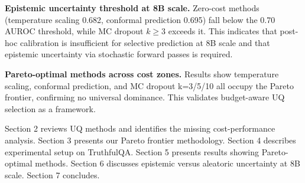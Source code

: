 \textbf{Epistemic uncertainty threshold at 8B scale.} Zero-cost methods (temperature scaling 0.682, conformal prediction 0.695) fall below the 0.70 AUROC threshold, while MC dropout $k\geq 3$ exceeds it. This indicates that post-hoc calibration is insufficient for selective prediction at 8B scale and that epistemic uncertainty via stochastic forward passes is required.

\textbf{Pareto-optimal methods across cost zones.} Results show temperature scaling, conformal prediction, and MC dropout k=3/5/10 all occupy the Pareto frontier, confirming no universal dominance. This validates budget-aware UQ selection as a framework.

Section 2 reviews UQ methods and identifies the missing cost-performance analysis. Section 3 presents our Pareto frontier methodology. Section 4 describes experimental setup on TruthfulQA. Section 5 presents results showing Pareto-optimal methods. Section 6 discusses epistemic versus aleatoric uncertainty at 8B scale. Section 7 concludes.

